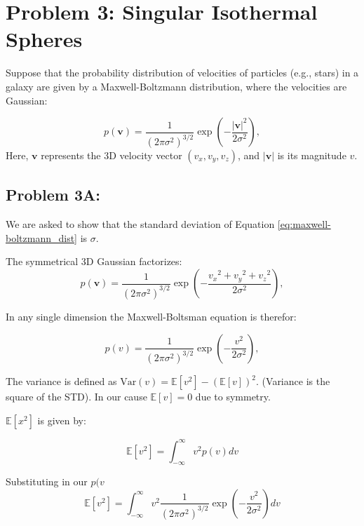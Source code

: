 \section*{Problem 3: Singular Isothermal Spheres}

Suppose that the probability distribution of velocities of particles (e.g., stars) in a galaxy are given by a
Maxwell-Boltzmann distribution, where the velocities are Gaussian:


\begin{equation} \label{eq:maxwell-boltzmann_dist}
p(\mathbf{v}) = \frac{1}{(2 \pi \sigma^2)^{3/2}} 
\exp\left( -\frac{|\mathbf{v}|^2}{2 \sigma^2} \right),
\end{equation}
Here, $\mathbf{v}$ represents the 3D velocity vector 
$(v_x, v_y, v_z)$, and $|\mathbf{v}|$ is its magnitude $v$.


\subsection*{Problem 3A:}
We are asked to show that the standard deviation of Equation \ref{eq:maxwell-boltzmann_dist} is $\sigma$. 

The symmetrical 3D Gaussian factorizes:
\begin{equation}
p(\mathbf{v}) = \frac{1}{(2 \pi \sigma^2)^{3/2}} 
\exp\left( -\frac{{v_x}^2 + {v_y}^2 + {v_z}^2}{2 \sigma^2} \right),
\end{equation}

In any single dimension the Maxwell-Boltsman equation is therefor: 

\begin{equation}
p({v}) = \frac{1}{(2 \pi \sigma^2)^{3/2}} 
\exp\left( -\frac{{v}^2 }{2 \sigma^2} \right),
\end{equation}

The variance is defined as $\mathrm{Var}(v) = \mathbb{E}[v^2] - (\mathbb{E}[v])^2$. (Variance is the square of the STD). In our cause $\mathbb{E}[v] = 0$ due to symmetry. 

$\mathbb{E}[x^2]$ is given by:

\begin{equation}
    \mathbb{E}[v^2] =
\int_{-\infty}^{\infty} v^2p(v)dv %
\end{equation}

Substituting in our $p(v$
\begin{equation}
    \mathbb{E}[v^2] =
\int_{-\infty}^{\infty} v^2\frac{1}{(2 \pi \sigma^2)^{3/2}} 
\exp\left( -\frac{{v}^2 }{2 \sigma^2} \right)dv %
\end{equation}



